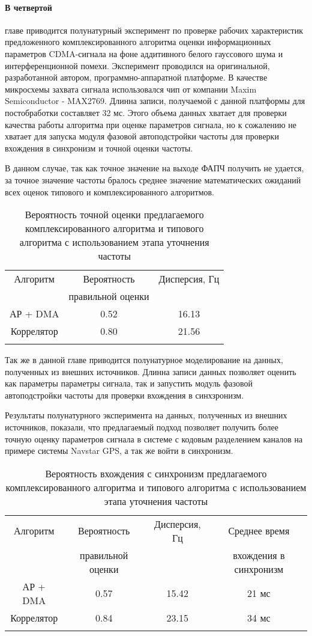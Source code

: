 \paragraph{В четвертой} главе приводится полунатурный эксперимент по проверке рабочих характеристик предложенного комплексированного алгоритма
оценки информационных параметров CDMA-сигнала на фоне аддитивного белого гауссового шума и интерференционной помехи.
Эксперимент проводился на оригинальной, разработанной автором, программно-аппаратной платформе.
В качестве микросхемы захвата сигнала использовался чип от компании Maxim Semiconductor - MAX2769. Длинна записи, получаемой
с данной платформы для постобработки составляет 32 мс. Этого объема данных хватает для проверки качества работы алгоритма при оценке
параметров сигнала, но к сожалению не хватает для запуска модуля фазовой автоподстройки частоты для проверки вхождения в синхронизм и точной оценки частоты.

В данном случае, так как точное значение на выходе ФАПЧ получить не удается, за точное значение частоты бралось среднее значение математических
ожиданий всех оценок типового и комплексированного алгоритмов.

{\centering
\begin{longtable}{ | c | c | c |}
	\hline
	Алгоритм	& Вероятность	& Дисперсия, Гц \\
			& правильной оценки&		\\ \hline
	АР + DMA	& 0.52 & 16.13	\\ \hline
	Коррелятор 	& 0.80 &  21.56 \\ \hline
	\caption{Вероятность точной оценки предлагаемого комплексированного алгоритма и типового алгоритма с использованием этапа уточнения частоты}
	\label{tbl:16MHz}
\end{longtable}}

Так же в данной главе приводится полунатурное моделирование на данных, полученных из внешних источников. Длинна записи данных
позволяет оценить как параметры параметры сигнала, так и запустить модуль фазовой автоподстройки частоты для проверки вхождения в синхзронизм.

Результаты полунатурного эксперимента на данных, полученных из внешних источников, показали, что предлагаемый подход позволяет получить более точную оценку параметров
сигнала в системе с кодовым разделением каналов на примере системы Navstar GPS, а так же войти в синхронизм.

{\centering
\begin{longtable}{ | c | c | c | c |}
	\hline
	Алгоритм	& Вероятность	& Дисперсия, Гц & Среднее время \\
			& правильной оценки&		& вхождения в синхронизм\\ \hline
	АР + DMA	& 0.57 		& 15.42		& 21 мс \\ \hline
	Коррелятор 	& 0.84 		& 23.15 	& 34 мс \\ \hline
	\caption{Вероятность вхождения с синхронизм предлагаемого комплексированного алгоритма и типового алгоритма с использованием этапа уточнения частоты}
	\label{tbl:5MHz}
\end{longtable}}

